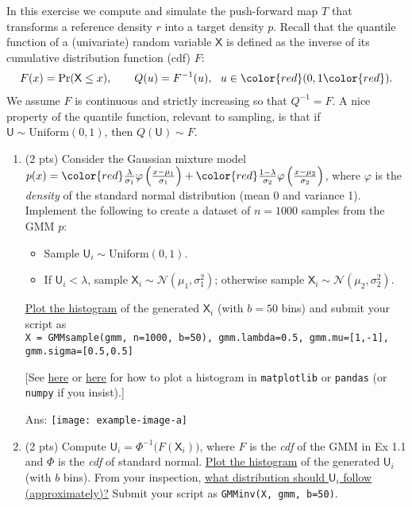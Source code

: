 \documentclass[10pt]{article}
\newcommand{\Usf}{\mathsf{U}}
\newcommand{\Xsf}{\mathsf{X}}
\newcommand{\ans}[1]{{\color{blue}\textsf{Ans}: #1}}
\newcommand{\red}[1]{{\color{red}#1}}
\begin{document}
\begin{exercise}
	In this exercise we compute and simulate the push-forward map $T$ that transforms a reference density $r$ into a target density $p$. Recall that the quantile function of a (univariate) random variable $\Xsf$ is defined as the inverse of its cumulative distribution function (cdf) $F$:
	\begin{align}
	F(x) = \Pr(\Xsf \leq x), \qquad
	Q(u) = F^{-1}(u),~~ u \in \red{(}0,1 \red{)}.
	\end{align}
	We assume $F$ is continuous and strictly increasing so that $Q^{-1} = F$. A nice property of the quantile function, relevant to sampling, is that if $\Usf \sim \mathrm{Uniform}(0,1)$, then $Q(\Usf) \sim F$.
	
	\begin{enumerate}
		\item (2 pts) Consider the Gaussian mixture model $p(x) = \red{\tfrac{\lambda}{\sigma_1}} \varphi\left( \frac{x-\mu_1}{\sigma_1}\right) + \red{\tfrac{1-\lambda}{\sigma_2}} \varphi\left( \frac{x-\mu_2}{\sigma_2}\right)$, where $\varphi$ is the \emph{density} of the standard normal distribution (mean 0 and variance 1). Implement the following to create a dataset of $n=1000$ samples from the GMM $p$:
		\begin{itemize}
			\item Sample $\Usf_i\sim \mathrm{Uniform}(0,1)$. 
			\item If $\Usf_i < \lambda$, sample $\Xsf_i \sim \mathcal{N}(\mu_1, \sigma_1^{2})$; otherwise sample $\Xsf_i \sim \mathcal{N}(\mu_2, \sigma_2^{2})$.
		\end{itemize}
		\uline{Plot the histogram} of the generated $\Xsf_i$ (with $b=50$ bins) and submit your script as \\ \verb|X = GMMsample(gmm, n=1000, b=50), gmm.lambda=0.5, gmm.mu=[1,-1], gmm.sigma=[0.5,0.5]|
		
		[See \href{https://pythonspot.com/matplotlib-histogram/}{here} or \href{https://realpython.com/python-histograms/}{here} for how to plot a histogram in \verb|matplotlib| or \verb|pandas| (or \verb|numpy| if you insist).]
		
		\ans{%
		\texttt{[image: example-image-a]}
		}
		
		\item (2 pts) Compute $\Usf_i = \Phi^{-1}\big(F(\Xsf_i))$, where $F$ is the \emph{cdf} of the GMM in Ex 1.1 and $\Phi$ is the \emph{cdf} of standard normal. \uline{Plot the histogram} of the generated $\Usf_i$ (with $b$ bins). From your inspection, \uline{what distribution should $\Usf_i$ follow (approximately)?} Submit your script as \verb|GMMinv(X, gmm, b=50)|.
		

\end{enumerate}
\end{exercise}
\end{document}
